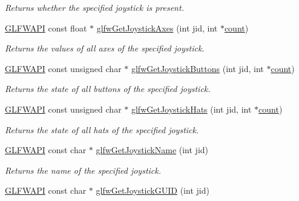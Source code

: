 \begin{DoxyCompactItemize}
\begin{DoxyCompactList}\small\item\em Returns whether the specified joystick is present. \end{DoxyCompactList}\item 
\mbox{\hyperlink{glfw3_8h_a56da5036b2cc259351ae22fd6439bb47}{G\+L\+F\+W\+A\+PI}} const float $\ast$ \mbox{\hyperlink{group__input_ga35584542703086f592530591815d2971}{glfw\+Get\+Joystick\+Axes}} (int jid, int $\ast$\mbox{\hyperlink{glad_8h_a83e2dd3e98558b907ab7fb03cee26bda}{count}})
\begin{DoxyCompactList}\small\item\em Returns the values of all axes of the specified joystick. \end{DoxyCompactList}\item 
\mbox{\hyperlink{glfw3_8h_a56da5036b2cc259351ae22fd6439bb47}{G\+L\+F\+W\+A\+PI}} const unsigned char $\ast$ \mbox{\hyperlink{group__input_gad326379e1b7ad94d431403e35cc4d9c3}{glfw\+Get\+Joystick\+Buttons}} (int jid, int $\ast$\mbox{\hyperlink{glad_8h_a83e2dd3e98558b907ab7fb03cee26bda}{count}})
\begin{DoxyCompactList}\small\item\em Returns the state of all buttons of the specified joystick. \end{DoxyCompactList}\item 
\mbox{\hyperlink{glfw3_8h_a56da5036b2cc259351ae22fd6439bb47}{G\+L\+F\+W\+A\+PI}} const unsigned char $\ast$ \mbox{\hyperlink{group__input_gab2db5ba5f1a85c306a1355bdca52e6be}{glfw\+Get\+Joystick\+Hats}} (int jid, int $\ast$\mbox{\hyperlink{glad_8h_a83e2dd3e98558b907ab7fb03cee26bda}{count}})
\begin{DoxyCompactList}\small\item\em Returns the state of all hats of the specified joystick. \end{DoxyCompactList}\item 
\mbox{\hyperlink{glfw3_8h_a56da5036b2cc259351ae22fd6439bb47}{G\+L\+F\+W\+A\+PI}} const char $\ast$ \mbox{\hyperlink{group__input_ga06c97ef59fb1e466e44d3e00e69aa32b}{glfw\+Get\+Joystick\+Name}} (int jid)
\begin{DoxyCompactList}\small\item\em Returns the name of the specified joystick. \end{DoxyCompactList}\item 
\mbox{\hyperlink{glfw3_8h_a56da5036b2cc259351ae22fd6439bb47}{G\+L\+F\+W\+A\+PI}} const char $\ast$ \mbox{\hyperlink{group__input_gafbfc5c641fdee03a50a1f9b9ac0671ae}{glfw\+Get\+Joystick\+G\+U\+ID}} (int jid)

\end{DoxyCompactItemize}
